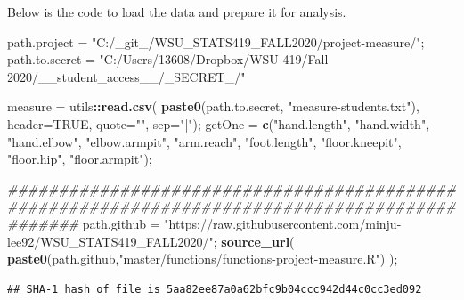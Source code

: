 \documentclass[]{article}
\newenvironment{Shaded}{\begin{snugshade}}{\end{snugshade}}
\newcommand{\CommentTok}[1]{\textcolor[rgb]{0.56,0.35,0.01}{\textit{#1}}}
\newcommand{\DataTypeTok}[1]{\textcolor[rgb]{0.13,0.29,0.53}{#1}}
\newcommand{\KeywordTok}[1]{\textcolor[rgb]{0.13,0.29,0.53}{\textbf{#1}}}
\newcommand{\NormalTok}[1]{#1}
\newcommand{\OperatorTok}[1]{\textcolor[rgb]{0.81,0.36,0.00}{\textbf{#1}}}
\newcommand{\OtherTok}[1]{\textcolor[rgb]{0.56,0.35,0.01}{#1}}
\newcommand{\StringTok}[1]{\textcolor[rgb]{0.31,0.60,0.02}{#1}}
\begin{document}
Below is the code to load the data and prepare it for analysis.

\begin{Shaded}
\begin{Highlighting}[]
\NormalTok{path.project =}\StringTok{ "C:/\_git\_/WSU\_STATS419\_FALL2020/project{-}measure/"}\NormalTok{;}
\NormalTok{path.to.secret =}\StringTok{ "C:/Users/13608/Dropbox/WSU{-}419/Fall 2020/\_\_student\_access\_\_/\_SECRET\_/"}

\NormalTok{measure =}\StringTok{ }\NormalTok{utils}\OperatorTok{::}\KeywordTok{read.csv}\NormalTok{( }\KeywordTok{paste0}\NormalTok{(path.to.secret, }\StringTok{"measure{-}students.txt"}\NormalTok{), }\DataTypeTok{header=}\OtherTok{TRUE}\NormalTok{, }\DataTypeTok{quote=}\StringTok{""}\NormalTok{, }\DataTypeTok{sep=}\StringTok{"|"}\NormalTok{);}
\NormalTok{getOne =}\StringTok{ }\KeywordTok{c}\NormalTok{(}\StringTok{"hand.length"}\NormalTok{, }\StringTok{"hand.width"}\NormalTok{, }\StringTok{"hand.elbow"}\NormalTok{, }\StringTok{"elbow.armpit"}\NormalTok{, }\StringTok{"arm.reach"}\NormalTok{, }\StringTok{"foot.length"}\NormalTok{, }\StringTok{"floor.kneepit"}\NormalTok{, }\StringTok{"floor.hip"}\NormalTok{, }\StringTok{"floor.armpit"}\NormalTok{);}

\CommentTok{\#\#\#\#\#\#\#\#\#\#\#\#\#\#\#\#\#\#\#\#\#\#\#\#\#\#\#\#\#\#\#\#\#\#\#\#\#\#\#\#\#\#\#\#\#\#\#\#\#\#\#\#\#\#\#\#\#\#\#\#\#\#\#\#\#\#\#\#\#\#\#\#\#\#\#\#\#\#\#\#\#\#\#\#\#\#\#\#\#\#\#\#\#\#\#}
\NormalTok{path.github =}\StringTok{ "https://raw.githubusercontent.com/minju{-}lee92/WSU\_STATS419\_FALL2020/"}\NormalTok{;}
\KeywordTok{source\_url}\NormalTok{( }\KeywordTok{paste0}\NormalTok{(path.github,}\StringTok{"master/functions/functions{-}project{-}measure.R"}\NormalTok{) );}
\end{Highlighting}
\end{Shaded}

\begin{verbatim}
## SHA-1 hash of file is 5aa82ee87a0a62bfc9b04ccc942d44c0cc3ed092
\end{verbatim}
\end{document}
